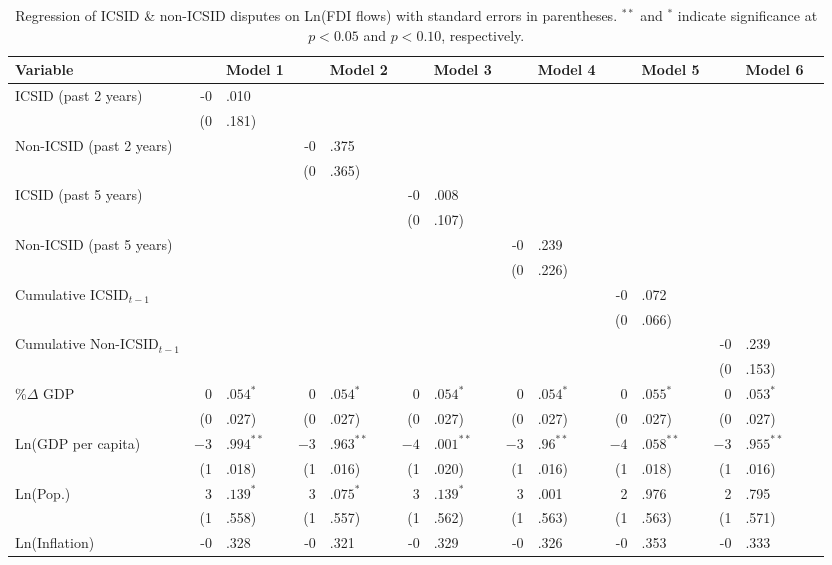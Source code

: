 \documentclass[12pt,onesided]{amsart}
\begin{document}
\begin{table}[ht]
\caption{Regression of ICSID \& non-ICSID disputes on Ln(FDI flows) with standard errors in parentheses. $^{**}$ and $^{*}$ indicate significance at $p< 0.05 $ and $p< 0.10 $, respectively.} 
\label{tab:dispFDI}
\centering
{\footnotesize
\begin{tabular}{lr@{} lr@{}lr@{}lr@{} lr@{}lr@{}lr@{} }
 Variable && Model 1 && Model 2 && Model 3 && Model 4 && Model 5 && Model 6 \\ 
  \hline
\hline
ICSID (past 2 years) & -0&.010 &&  &&  &&  &&  &&  \\ 
   & (0&.181) &&  &&  &&  &&  &&  \\ 
  Non-ICSID (past 2 years) &&  & -0&.375 &&  &&  &&  &&  \\ 
   &&  & (0&.365) &&  &&  &&  &&  \\    
  ICSID (past 5 years) &&  &&  & -0&.008 &&  &&  &&  \\ 
   &&  &&  & (0&.107) &&  &&  &&  \\ 
  Non-ICSID (past 5 years) &&  &&  &&  & -0&.239 &&  &&  \\ 
   &&  &&  &&  & (0&.226) &&  &&  \\    
  Cumulative ICSID$_{t-1}$ &&  &&  &&  &&  & -0&.072 &&  \\ 
   &&  &&  &&  &&  & (0&.066) &&  \\ 
  Cumulative Non-ICSID$_{t-1}$ &&  &&  &&  &&  &&  & -0&.239 \\ 
   &&  &&  &&  &&  &&  & (0&.153) \\ 
  \%$\Delta$ GDP & $0$&$.054^{\ast}$ & $0$&$.054^{\ast}$ & $0$&$.054^{\ast}$ & $0$&$.054^{\ast}$ & $0$&$.055^{\ast}$ & $0$&$.053^{\ast}$ \\ 
   & (0&.027) & (0&.027) & (0&.027) & (0&.027) & (0&.027) & (0&.027) \\ 
  Ln(GDP per capita) & $-3$&$.994^{\ast\ast}$ & $-3$&$.963^{\ast\ast}$ & $-4$&$.001^{\ast\ast}$ & $-3$&$.96^{\ast\ast}$ & $-4$&$.058^{\ast\ast}$ & $-3$&$.955^{\ast\ast}$ \\ 
   & (1&.018) & (1&.016) & (1&.020) & (1&.016) & (1&.018) & (1&.016) \\ 
  Ln(Pop.) & $3$&$.139^{\ast}$ & $3$&$.075^{\ast}$ & $3$&$.139^{\ast}$ & 3&.001 & 2&.976 & 2&.795 \\ 
   & (1&.558) & (1&.557) & (1&.562) & (1&.563) & (1&.563) & (1&.571) \\ 
  Ln(Inflation) & -0&.328 & -0&.321 & -0&.329 & -0&.326 & -0&.353 & -0&.333 \\ 

\end{tabular}}
\end{table}
\end{document}
